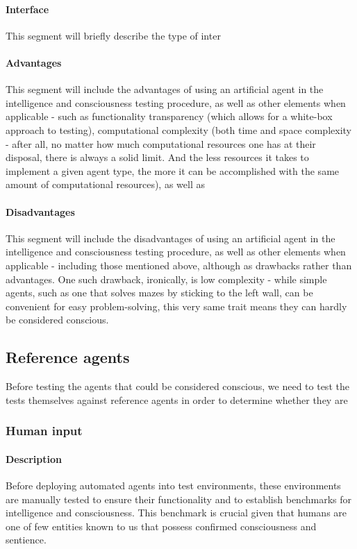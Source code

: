 \documentclass[masterthesis]{fer}
\begin{document}
\paragraph{Interface}
This segment will briefly describe the type of inter
\paragraph{Advantages}
This segment will include the advantages of using an artificial agent in the intelligence and consciousness testing procedure, as well as other elements when applicable - such as functionality transparency (which allows for a white-box approach to testing), computational complexity (both time and space complexity - after all, no matter how much computational resources one has at their disposal, there is always a solid limit. And the less resources it takes to implement a given agent type, the more it can be accomplished with the same amount of computational resources), as well as 
\paragraph{Disadvantages}
This segment will include the disadvantages of using an artificial agent in the intelligence and consciousness testing procedure, as well as other elements when applicable - including those mentioned above, although as drawbacks rather than advantages. One such drawback, ironically, is low complexity - while simple agents, such as one that solves mazes by sticking to the left wall, can be convenient for easy problem-solving, this very same trait means they can hardly be considered conscious.
\subsection{Reference agents}
Before testing the agents that could be considered conscious, we need to test the tests themselves against reference agents in order to determine whether they are 
\subsubsection{Human input}

\paragraph{Description}
Before deploying automated agents into test environments, 
these environments are manually tested to ensure their functionality and to establish benchmarks for intelligence and consciousness. This benchmark is crucial given that humans are one of few entities known to us that possess confirmed consciousness and sentience.
\end{document}
